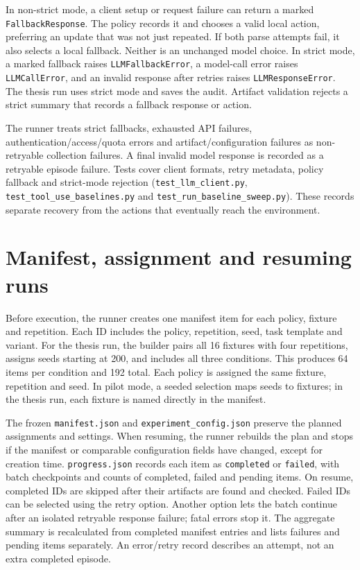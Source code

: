 \documentclass[12pt,a4paper,oneside]{report}
\begin{document}
In non-strict mode, a client setup or request failure can return a marked \texttt{FallbackResponse}. The policy records it and chooses a valid local action, preferring an update that was not just repeated. If both parse attempts fail, it also selects a local fallback. Neither is an unchanged model choice. In strict mode, a marked fallback raises \texttt{LLMFallbackError}, a model-call error raises \texttt{LLMCallError}, and an invalid response after retries raises \texttt{LLMResponseError}. The thesis run uses strict mode and saves the audit. Artifact validation rejects a strict summary that records a fallback response or action.

The runner treats strict fallbacks, exhausted API failures, authentication/access/quota errors and artifact/configuration failures as non-retryable collection failures. A final invalid model response is recorded as a retryable episode failure. Tests cover client formats, retry metadata, policy fallback and strict-mode rejection (\texttt{test\allowbreak\_llm\allowbreak\_client.py}, \texttt{test\allowbreak\_tool\allowbreak\_use\allowbreak\_baselines.py} and \texttt{test\allowbreak\_run\allowbreak\_baseline\allowbreak\_sweep.py}). These records separate recovery from the actions that eventually reach the environment.

\section{Manifest, assignment and resuming runs}
Before execution, the runner creates one manifest item for each policy, fixture and repetition. Each ID includes the policy, repetition, seed, task template and variant. For the thesis run, the builder pairs all 16 fixtures with four repetitions, assigns seeds starting at 200, and includes all three conditions. This produces 64 items per condition and 192 total. Each policy is assigned the same fixture, repetition and seed. In pilot mode, a seeded selection maps seeds to fixtures; in the thesis run, each fixture is named directly in the manifest.

The frozen \texttt{manifest.json} and \texttt{experiment\allowbreak\_config.json} preserve the planned assignments and settings. When resuming, the runner rebuilds the plan and stops if the manifest or comparable configuration fields have changed, except for creation time. \texttt{progress.json} records each item as \texttt{completed} or \texttt{failed}, with batch checkpoints and counts of completed, failed and pending items. On resume, completed IDs are skipped after their artifacts are found and checked. Failed IDs can be selected using the retry option. Another option lets the batch continue after an isolated retryable response failure; fatal errors stop it. The aggregate summary is recalculated from completed manifest entries and lists failures and pending items separately. An error/retry record describes an attempt, not an extra completed episode.
\end{document}

